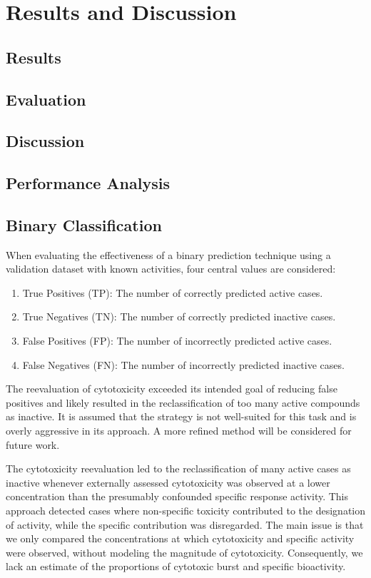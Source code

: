 \chapter{Results and Discussion}\label{chap:results_discussion}
\section{Results}\label{sec:results}
\section{Evaluation}\label{sec:evaluation}
\section{Discussion}\label{sec:discussion}
\section{Performance Analysis}\label{sec:performance_analysis}
\section{Binary Classification}\label{sec:binary_classification}
When evaluating the effectiveness of a binary prediction technique using a validation dataset with known activities, four central values are considered:

\begin{enumerate}
  \item True Positives (TP): The number of correctly predicted active cases.
  \item True Negatives (TN): The number of correctly predicted inactive cases.
  \item False Positives (FP): The number of incorrectly predicted active cases.
  \item False Negatives (FN): The number of incorrectly predicted inactive cases.
\end{enumerate}



The reevaluation of cytotoxicity exceeded its intended goal of reducing false positives and likely resulted in the reclassification of too many active compounds as inactive. It is assumed that the strategy is not well-suited for this task and is overly aggressive in its approach. A more refined method will be considered for future work.

The cytotoxicity reevaluation led to the reclassification of many active cases as inactive whenever externally assessed cytotoxicity was observed at a lower concentration than the presumably confounded specific response activity. This approach detected cases where non-specific toxicity contributed to the designation of activity, while the specific contribution was disregarded. The main issue is that we only compared the concentrations at which cytotoxicity and specific activity were observed, without modeling the magnitude of cytotoxicity. Consequently, we lack an estimate of the proportions of cytotoxic burst and specific bioactivity.

